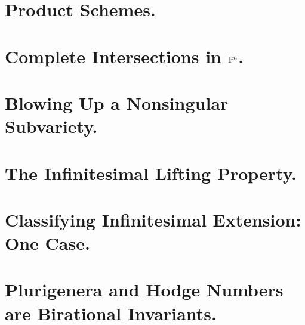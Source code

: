 \documentclass[a4paper]{jsarticle}
\begin{document}
\section{Product Schemes.} %

\section{Complete Intersections in $\mathbb{P}^n$.} %

\section{Blowing Up a Nonsingular Subvariety.} %

\section{The Infinitesimal Lifting Property.} %

\section{Classifying Infinitesimal Extension: One Case.} %

\section{Plurigenera and Hodge Numbers are Birational Invariants.} %
\end{document}
